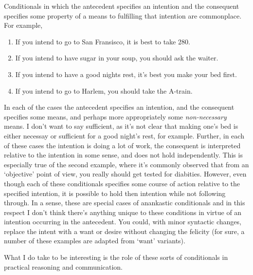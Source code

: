 \documentclass[10pt]{article}
\begin{document}
Conditionals in which the antecedent specifies an intention and the consequent specifies some property of a means to fulfilling that intention are commonplace.
For example,
\begin{enumerate}
\item If you intend to go to San Fransisco, it is best to take 280.
\item If you intend to have sugar in your soup, you should ask the waiter.
\item If you intend to have a good nights rest, it's best you make your bed first.
\item If you intend to go to Harlem, you should take the A-train.
\end{enumerate}

In each of the cases the antecedent specifies an intention, and the consequent specifies some means, and perhaps more appropriately some \emph{non-necessary} means.
I don't want to say sufficient, as it's not clear that making one's bed is either necessay or sufficient for a good night's rest, for example.
Further, in each of these cases the intention is doing a lot of work, the consequent is interpreted relative to the intention in some sense, and does not hold independently.
This is especially true of the second example, where it's commonly observed that from an `objective' point of view, you really should get tested for diabities.
However, even though each of these conditionals specifies some course of action relative to the specified intention, it is possible to hold then intention while not following through.
In a sense, these are special cases of anankastic conditionals and in this respect I don't think there's anything unique to these conditions in virtue of an intention occurring in the antecedent.
You could, with minor syntactic changes, replace the intent with a want or desire without changing the felicity (for sure, a number of these examples are adapted from `want' variants).

What I do take to be interesting is the role of these sorts of conditionals in practical reasoning and communication.
\end{document}
